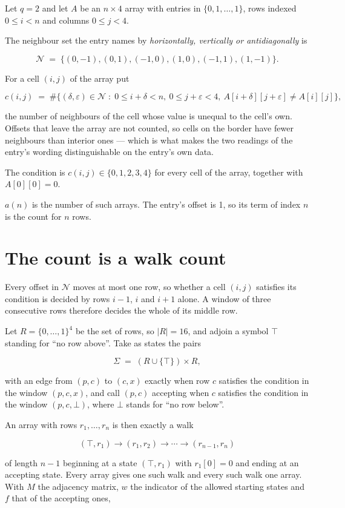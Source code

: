 \documentclass[11pt]{article}
\theoremstyle{definition}
\begin{document}
Let $q = 2$ and let $A$ be an $n \times 4$ array with entries in $\{0,1,\dots,1\}$, rows indexed $0 \le i < n$ and columns $0 \le j < 4$.

The neighbour set the entry names by {\itshape horizontally, vertically or antidiagonally} is

\[\mathcal{N} \;=\; \{(0,-1), (0,1), (-1,0), (1,0), (-1,1), (1,-1)\}.\]

For a cell $(i,j)$ of the array put

\[c(i,j) \;=\; \#\bigl\{(\delta,\varepsilon)\in\mathcal{N} \;:\; 0\le i+\delta<n,\ 0\le j+\varepsilon<4,\ A[i+\delta][j+\varepsilon] \neq A[i][j]\bigr\},\]

the number of neighbours of the cell whose value is unequal to the cell's own. Offsets that leave the array are not counted, so cells on the border have fewer neighbours than interior ones --- which is what makes the two readings of the entry's wording distinguishable on the entry's own data.

The condition is $c(i,j) \in \{0, 1, 2, 3, 4\}$ for every cell of the array, together with $A[0][0]=0$.

$a(n)$ is the number of such arrays. The entry's offset is 1, so its term of index $n$ is the count for $n$ rows.

\section{The count is a walk count}

Every offset in $\mathcal{N}$ moves at most one row, so whether a cell $(i,j)$ satisfies its condition is decided by rows $i-1$, $i$ and $i+1$ alone. A window of three consecutive rows therefore decides the whole of its middle row.

Let $R = \{0,\dots,1\}^{4}$ be the set of rows, so $|R| = 16$, and adjoin a symbol $\top$ standing for ``no row above''. Take as states the pairs

\[\Sigma \;=\; (R \cup \{\top\}) \times R,\]

with an edge from $(p,c)$ to $(c,x)$ exactly when row $c$ satisfies the condition in the window $(p,c,x)$, and call $(p,c)$ accepting when $c$ satisfies the condition in the window $(p,c,\bot)$, where $\bot$ stands for ``no row below''.

An array with rows $r_1,\dots,r_n$ is then exactly a walk

\[(\top,r_1) \to (r_1,r_2) \to \cdots \to (r_{n-1},r_n)\]

of length $n-1$ beginning at a state $(\top,r_1)$ with $r_1[0]=0$ and ending at an accepting state. Every array gives one such walk and every such walk one array. With $M$ the adjacency matrix, $w$ the indicator of the allowed starting states and $f$ that of the accepting ones,
\end{document}
